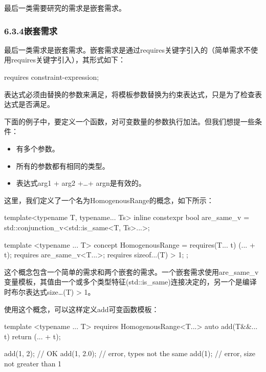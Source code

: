 最后一类需要研究的需求是嵌套需求。

\subsubsection{6.3.4\hspace{0.2cm}嵌套需求}

最后一类需求是嵌套需求。嵌套需求是通过requires关键字引入的（简单需求不使用requires关键字引入），其形式如下：

\begin{cpp}
requires constraint-expression;
\end{cpp}

表达式必须由替换的参数来满足，将模板参数替换为约束表达式，只是为了检查表达式是否满足。

下面的例子中，要定义一个函数，对可变数量的参数执行加法。但我们想提一些条件：

\begin{itemize}
\item
有多个参数。

\item
所有的参数都有相同的类型。

\item
表达式arg1 + arg2 +…+ argn是有效的。
\end{itemize}

这里，我们定义了一个名为HomogenousRange的概念，如下所示：

\begin{cpp}
template<typename T, typename... Ts>
inline constexpr bool are_same_v =
	std::conjunction_v<std::is_same<T, Ts>...>;
	
template <typename ... T>
concept HomogenousRange = requires(T... t)
{
	(... + t);
	requires are_same_v<T...>;
	requires sizeof...(T) > 1;
};
\end{cpp}

这个概念包含一个简单的需求和两个嵌套的需求。一个嵌套需求使用are\_same\_v变量模板，其值由一个或多个类型特征(std::is\_same)连接决定的，另一个是编译时布尔表达式size…(T) > 1。

使用这个概念，可以这样定义add可变函数模板：

\begin{cpp}
template <typename ... T>
requires HomogenousRange<T...>
auto add(T&&... t)
{
	return (... + t);
}

add(1, 2); // OK
add(1, 2.0); // error, types not the same
add(1); // error, size not greater than 1
\end{cpp}

